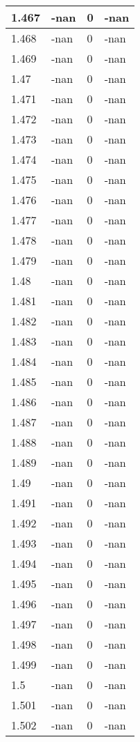 \documentclass[a4paper,14pt]{extarticle}
\begin{document}
\begin{longtable}{||m{3cm}||m{3cm}|m{3cm}||m{3cm}||}
\hline
1.467 & -nan & 0 & -nan\\
\hline
1.468 & -nan & 0 & -nan\\
\hline
1.469 & -nan & 0 & -nan\\
\hline
1.47 & -nan & 0 & -nan\\
\hline
1.471 & -nan & 0 & -nan\\
\hline
1.472 & -nan & 0 & -nan\\
\hline
1.473 & -nan & 0 & -nan\\
\hline
1.474 & -nan & 0 & -nan\\
\hline
1.475 & -nan & 0 & -nan\\
\hline
1.476 & -nan & 0 & -nan\\
\hline
1.477 & -nan & 0 & -nan\\
\hline
1.478 & -nan & 0 & -nan\\
\hline
1.479 & -nan & 0 & -nan\\
\hline
1.48 & -nan & 0 & -nan\\
\hline
1.481 & -nan & 0 & -nan\\
\hline
1.482 & -nan & 0 & -nan\\
\hline
1.483 & -nan & 0 & -nan\\
\hline
1.484 & -nan & 0 & -nan\\
\hline
1.485 & -nan & 0 & -nan\\
\hline
1.486 & -nan & 0 & -nan\\
\hline
1.487 & -nan & 0 & -nan\\
\hline
1.488 & -nan & 0 & -nan\\
\hline
1.489 & -nan & 0 & -nan\\
\hline
1.49 & -nan & 0 & -nan\\
\hline
1.491 & -nan & 0 & -nan\\
\hline
1.492 & -nan & 0 & -nan\\
\hline
1.493 & -nan & 0 & -nan\\
\hline
1.494 & -nan & 0 & -nan\\
\hline
1.495 & -nan & 0 & -nan\\
\hline
1.496 & -nan & 0 & -nan\\
\hline
1.497 & -nan & 0 & -nan\\
\hline
1.498 & -nan & 0 & -nan\\
\hline
1.499 & -nan & 0 & -nan\\
\hline
1.5 & -nan & 0 & -nan\\
\hline
1.501 & -nan & 0 & -nan\\
\hline
1.502 & -nan & 0 & -nan\\

\end{longtable}
\end{document}
